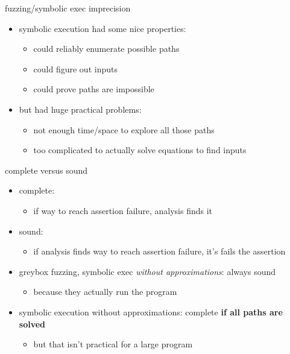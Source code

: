 \begin{frame}{fuzzing/symbolic exec imprecision}
    \begin{itemize}
    \item symbolic execution had some nice properties:
        \begin{itemize}
        \item could reliably enumerate possible paths
        \item could figure out inputs
        \item could prove paths are impossible
        \end{itemize}
    \item but had huge practical problems:
        \begin{itemize}
        \item not enough time/space to explore all those paths
        \item too complicated to actually solve equations to find inputs
        \end{itemize}
    \end{itemize}
\end{frame}

\begin{frame}{complete versus sound}
    \begin{itemize}
        \item complete:
            \begin{itemize}
            \item if way to reach assertion failure, analysis finds it
            \end{itemize}
        \item sound:
            \begin{itemize}
            \item if analysis finds way to reach assertion failure, it's fails the assertion
            \end{itemize}
        \vspace{.5cm}
        \item greybox fuzzing, symbolic exec \textit{without approximations}: always sound
            \begin{itemize}
            \item because they actually run the program
            \end{itemize}
        \item symbolic execution without approximations: complete \textbf{if all paths are solved}
            \begin{itemize}
            \item but that isn't practical for a large program
            \end{itemize}
    \end{itemize}
\end{frame}

